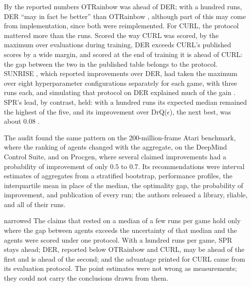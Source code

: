 \begin{refsection}
By the reported numbers OTRainbow was ahead of DER; with a hundred runs, DER ``may in fact be better'' than OTRainbow \parencite[Section~3]{AgarwalEtAl2021}, although part of this may come from implementation, since both were reimplemented. For CURL, the protocol mattered more than the runs. Scored the way CURL was scored, by the maximum over evaluations during training, DER exceeds CURL's published scores by a wide margin, and scored at the end of training it is ahead of CURL: the gap between the two in the published table belongs to the protocol. SUNRISE \parencite{LeeEtAl2021}, which reported improvements over DER, had taken the maximum over eight hyperparameter configurations separately for each game, with three runs each, and simulating that protocol on DER explained much of the gain \parencite[Appendix~A.4]{AgarwalEtAl2021}. SPR's lead, by contrast, held: with a hundred runs its expected median remained the highest of the five, and its improvement over DrQ($\epsilon$), the next best, was about $0.08$ \parencite[Section~3]{AgarwalEtAl2021}.

The audit found the same pattern on the 200-million-frame Atari benchmark, where the ranking of agents changed with the aggregate, on the DeepMind Control Suite, and on Procgen, where several claimed improvements had a probability of improvement of only $0.5$ to $0.7$. Its recommendations were interval estimates of aggregates from a stratified bootstrap, performance profiles, the interquartile mean in place of the median, the optimality gap, the probability of improvement, and publication of every run; the authors released a library, rliable, and all of their runs.

\begin{verdict}{narrowed}
The claims that rested on a median of a few runs per game hold only where the gap between agents exceeds the uncertainty of that median and the agents were scored under one protocol. With a hundred runs per game, SPR stays ahead; DER, reported below OTRainbow and CURL, may be ahead of the first and is ahead of the second; and the advantage printed for CURL came from its evaluation protocol. The point estimates were not wrong as measurements; they could not carry the conclusions drawn from them.
\end{verdict}


\end{refsection}
